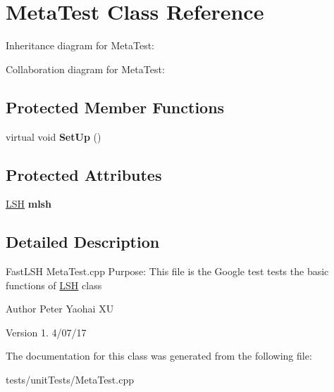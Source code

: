 \hypertarget{classMetaTest}{}\section{Meta\+Test Class Reference}
\label{classMetaTest}


Inheritance diagram for Meta\+Test\+:


Collaboration diagram for Meta\+Test\+:
\subsection*{Protected Member Functions}
\begin{DoxyCompactItemize}
\item 
virtual void {\bfseries Set\+Up} ()\hypertarget{classMetaTest_a2e3e8868e893ef00699ca4e186b31725}{}\label{classMetaTest_a2e3e8868e893ef00699ca4e186b31725}

\end{DoxyCompactItemize}
\subsection*{Protected Attributes}
\begin{DoxyCompactItemize}
\item 
\hyperlink{classLSH}{L\+SH} {\bfseries mlsh}\hypertarget{classMetaTest_ad18e70fa6a30573094c7496f65234950}{}\label{classMetaTest_ad18e70fa6a30573094c7496f65234950}

\end{DoxyCompactItemize}


\subsection{Detailed Description}
Fast\+L\+SH Meta\+Test.\+cpp Purpose\+: This file is the Google test tests the basic functions of \hyperlink{classLSH}{L\+SH} class

\begin{DoxyAuthor}{Author}
Peter Yaohai XU 
\end{DoxyAuthor}
\begin{DoxyVersion}{Version}
1. 4/07/17 
\end{DoxyVersion}


The documentation for this class was generated from the following file\+:\begin{DoxyCompactItemize}
\item 
tests/unit\+Tests/Meta\+Test.\+cpp\end{DoxyCompactItemize}
